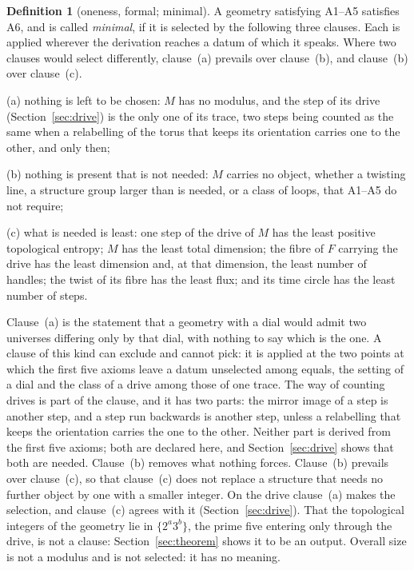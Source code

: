 \documentclass[11pt,a4paper]{article}
\theoremstyle{plain}
\theoremstyle{definition}
\newtheorem{definition}[theorem]{Definition}
\theoremstyle{remark}
\begin{document}
\begin{definition}[oneness, formal; minimal]\label{def:minimal}
A geometry satisfying A1--A5 satisfies A6, and is called \emph{minimal}, if it is selected by the following three clauses. Each is applied wherever the derivation reaches a datum of which it speaks. Where two clauses would select differently, clause~(a) prevails over clause~(b), and clause~(b) over clause~(c).

(a) nothing is left to be chosen: $M$ has no modulus, and the step of its drive (Section~\ref{sec:drive}) is the only one of its trace, two steps being counted as the same when a relabelling of the torus that keeps its orientation carries one to the other, and only then;

(b) nothing is present that is not needed: $M$ carries no object, whether a twisting line, a structure group larger than is needed, or a class of loops, that A1--A5 do not require;

(c) what is needed is least: one step of the drive of $M$ has the least positive topological entropy; $M$ has the least total dimension; the fibre of $F$ carrying the drive has the least dimension and, at that dimension, the least number of handles; the twist of its fibre has the least flux; and its time circle has the least number of steps.
\end{definition}

Clause~(a) is the statement that a geometry with a dial would admit two universes differing only by that dial, with nothing to say which is the one. A clause of this kind can exclude and cannot pick: it is applied at the two points at which the first five axioms leave a datum unselected among equals, the setting of a dial and the class of a drive among those of one trace. The way of counting drives is part of the clause, and it has two parts: the mirror image of a step is another step, and a step run backwards is another step, unless a relabelling that keeps the orientation carries the one to the other. Neither part is derived from the first five axioms; both are declared here, and Section~\ref{sec:drive} shows that both are needed. Clause~(b) removes what nothing forces.
Clause~(b) prevails over clause~(c), so that clause~(c) does not replace a structure that needs no further object by one with a smaller integer.
 On the drive clause~(a) makes the selection, and clause~(c) agrees with it (Section~\ref{sec:drive}). That the topological integers of the geometry lie in $\{2^{a}3^{b}\}$, the prime five entering only through the drive, is not a clause: Section~\ref{sec:theorem} shows it to be an output. Overall size is not a modulus and is not selected: it has no meaning.
\end{document}
